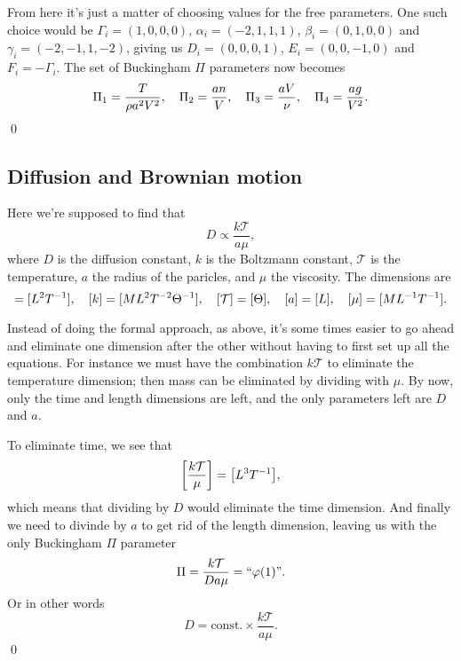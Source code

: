 \documentclass[11pt,letter, swedish, english
]{article}
\begin{document}
From here it's just a matter of choosing values for the free
parameters. One such choice would be $\Gamma_i=(1, 0, 0, 0)$, 
$\alpha_i=(-2, 1, 1, 1)$, $\beta_i=(0, 1, 0, 0)$ and
$\gamma_i=(-2, -1, 1, -2)$, giving us $D_i=(0, 0, 0, 1)$, 
$E_i=(0, 0, -1, 0)$ and $F_i=-\Gamma_i$.
The set of Buckingham $\Pi$
parameters now becomes
\begin{equation}
\Pi_1=\frac{T}{\rho a^2V^2}\qcomma \Pi_2=\frac{an}{V}\qcomma
\Pi_3=\frac{aV}{\nu}\qcomma \Pi_4=\frac{ag}{V^2}.
\end{equation}
\qed

\subsection{Diffusion and Brownian motion}
Here we're supposed to find that
\begin{equation}
D\propto\frac{k\mathcal{T}}{a\mu},
\end{equation}
where $D$ is the diffusion constant, $k$ is the Boltzmann constant,
$\mathcal{T}$ is the temperature, $a$ the radius of the paricles, and $\mu$ the
viscosity. The dimensions are
\begin{equation}
[D]=[L^2T^{-1}]\qcomma [k]=[ML^2T^{-2}\Theta^{-1}]\qcomma 
[\mathcal{T}]=[\Theta]\qcomma 
[a]=[L]\qcomma [\mu]=[ML^{-1}T^{-1}].
\end{equation}

Instead of doing the formal approach, as above, it's some times easier
to go ahead and eliminate one dimension after the other without
having to first set up all the equations. For instance we must have the
combination $k\mathcal{T}$ to eliminate the temperature dimension; then mass can
be eliminated by dividing with $\mu$. By now, only the time and length
dimensions are left, and the only parameters left are $D$ and $a$. 

To eliminate time, we see that
\begin{equation}
\qty[\frac{k\mathcal{T}}{\mu}] = \qty[L^3T^{-1}],
\end{equation}
which means that dividing by $D$ would eliminate the time
dimension. And finally we need to divinde by $a$ to get rid of the
length dimension, leaving us with the only Buckingham $\Pi$ parameter
\begin{equation}
\Pi=\frac{k\mathcal{T}}{Da\mu} = ``\varphi(1)\text{''}.
\end{equation}
Or in other words
\begin{equation}
D=\text{const.}\times\frac{k\mathcal{T}}{a\mu}.
\end{equation}
\qed
\end{document}
